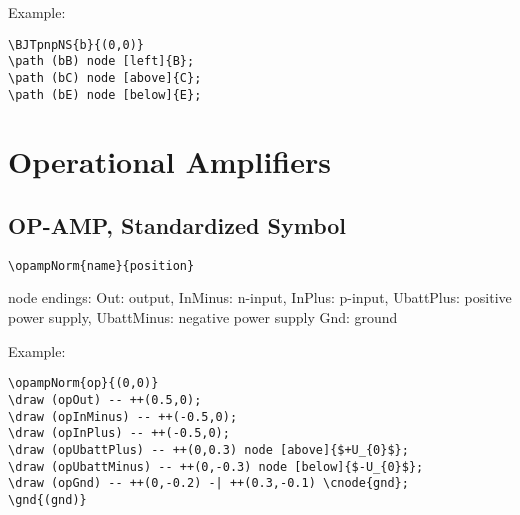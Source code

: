 \documentclass[parskip=full]{scrartcl}
\begin{document}
Example:\\
\begin{minipage}{0.8\textwidth}
\begin{verbatim}
\BJTpnpNS{b}{(0,0)}
\path (bB) node [left]{B};
\path (bC) node [above]{C};
\path (bE) node [below]{E};
\end{verbatim}
\end{minipage}
\begin{minipage}{0.19\textwidth}
\end{minipage}

\section{Operational Amplifiers}

\subsection{OP-AMP, Standardized Symbol}

\begin{verbatim}
\opampNorm{name}{position}
\end{verbatim}
node endings: Out: output, InMinus: n-input, InPlus: p-input,
              UbattPlus: positive power supply,
              UbattMinus: negative power supply
              Gnd: ground

Example:\\
\begin{minipage}{0.8\textwidth}
\begin{verbatim}
\opampNorm{op}{(0,0)}
\draw (opOut) -- ++(0.5,0);
\draw (opInMinus) -- ++(-0.5,0);
\draw (opInPlus) -- ++(-0.5,0);
\draw (opUbattPlus) -- ++(0,0.3) node [above]{$+U_{0}$};
\draw (opUbattMinus) -- ++(0,-0.3) node [below]{$-U_{0}$};
\draw (opGnd) -- ++(0,-0.2) -| ++(0.3,-0.1) \cnode{gnd};
\gnd{(gnd)}
\end{verbatim}
\end{minipage}
\begin{minipage}{0.19\textwidth}
\end{minipage}
\end{document}
